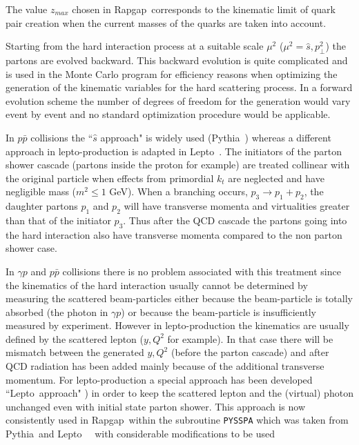 \documentclass[10pt]{article} \usepackage{dina4}
\newcommand{\PT}{p_{\perp}}
\def\RAPGAP{{\sc Rapgap}}
\def\LEPTO{{\sc Lepto}}
\def\PYTHIA{{\sc Pythia}}
\begin{document}
The value $z_{max}$ chosen in \RAPGAP\ corresponds to the kinematic limit
of quark pair creation when the current masses of the quarks are taken into
account.
\par
 Starting from the hard interaction process at a
suitable scale $\mu ^2$ ($\mu ^2 = \hat{s},\PT ^2$)
the partons are evolved backward. This backward evolution is quite
complicated and is used in the Monte Carlo program for efficiency 
reasons when optimizing the generation of the kinematic variables for
the hard scattering process. In a forward evolution scheme the number of
degrees of freedom for the generation would vary event by event and no 
standard optimization procedure would be applicable.
\par
In $p\bar{p}$ collisions the ``$\hat{s}$ approach" is widely used
(\PYTHIA\ \cite{PYTHIAPSa,PYTHIAPSb}) 
whereas a different approach in lepto-production is
adapted in \LEPTO\ \cite{LEPTOPS,MEPS}.
The initiators of the parton shower cascade (partons inside the
proton for example) are treated collinear with the original particle
when effects from primordial $k_t$ are neglected and have negligible
mass ($m^2 \leq 1$ GeV). When a branching occurs, $p_3
\rightarrow p_1 + p_2$,
the daughter partons $p_1$ and $p_2$ will have transverse momenta
and virtualities greater than that of the initiator $p_3$. Thus
after the QCD cascade the partons going into the hard interaction
also have transverse momenta compared to the non parton shower case.
\par
In $\gamma p$ and $p\bar{p}$ collisions there is no problem
associated with this treatment since the kinematics of the hard
interaction usually cannot be determined by measuring the
scattered beam-particles either because the beam-particle is
totally absorbed (the photon in $\gamma p$) or because the
beam-particle is insufficiently measured by experiment. However in
lepto-production the kinematics are usually defined by the scattered
lepton ($y, Q^2$ for example). In that case there will be mismatch
between the generated $y,Q^2$ (before the parton cascade) and after
QCD radiation has been added mainly because of the additional
transverse momentum. For lepto-production a special approach has
been developed ``\LEPTO\ approach" \cite{LEPTOPS,MEPS}) 
in order to keep the scattered
lepton and the (virtual) photon unchanged even with initial state
parton shower. This approach is now consistently used in \RAPGAP\ within
the subroutine \verb+PYSSPA+ which was taken from \PYTHIA\ and 
\LEPTO\ ~\cite{Jetsetc,MEPS} with considerable modifications to be used
\end{document}
